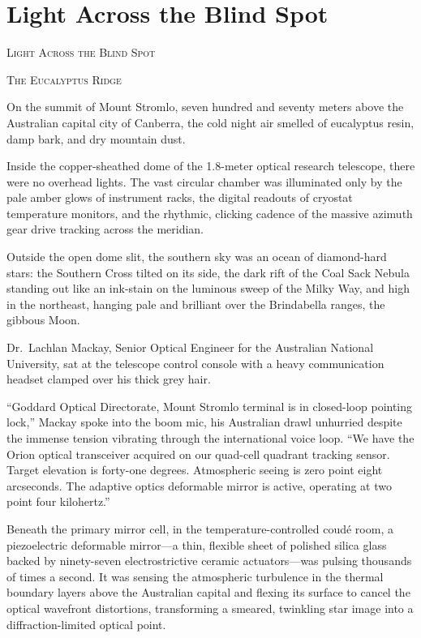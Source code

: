 \documentclass[12pt,twoside,openright]{book}
\newcommand{\sceneheader}[1]{%
  \par\vspace{1.8em}%
  {\noindent\centering\scshape\large #1\par}%
  \vspace{1.0em}%
  \noindent%
}
\begin{document}
\chapter{Light Across the Blind Spot}
\sceneheader{Light Across the Blind
Spot}

\sceneheader{The Eucalyptus Ridge}

On the summit of Mount Stromlo, seven hundred and seventy meters above
the Australian capital city of Canberra, the cold night air smelled of
eucalyptus resin, damp bark, and dry mountain dust.

Inside the copper-sheathed dome of the 1.8-meter optical research
telescope, there were no overhead lights. The vast circular chamber was
illuminated only by the pale amber glows of instrument racks, the
digital readouts of cryostat temperature monitors, and the rhythmic,
clicking cadence of the massive azimuth gear drive tracking across the
meridian.

Outside the open dome slit, the southern sky was an ocean of
diamond-hard stars: the Southern Cross tilted on its side, the dark rift
of the Coal Sack Nebula standing out like an ink-stain on the luminous
sweep of the Milky Way, and high in the northeast, hanging pale and
brilliant over the Brindabella ranges, the gibbous Moon.

Dr.~Lachlan Mackay, Senior Optical Engineer for the Australian National
University, sat at the telescope control console with a heavy
communication headset clamped over his thick grey hair.

``Goddard Optical Directorate, Mount Stromlo terminal is in closed-loop
pointing lock,'' Mackay spoke into the boom mic, his Australian drawl
unhurried despite the immense tension vibrating through the
international voice loop. ``We have the Orion optical transceiver
acquired on our quad-cell quadrant tracking sensor. Target elevation is
forty-one degrees. Atmospheric seeing is zero point eight arcseconds.
The adaptive optics deformable mirror is active, operating at two point
four kilohertz.''

Beneath the primary mirror cell, in the temperature-controlled coudé
room, a piezoelectric deformable mirror---a thin, flexible sheet of
polished silica glass backed by ninety-seven electrostrictive ceramic
actuators---was pulsing thousands of times a second. It was sensing the
atmospheric turbulence in the thermal boundary layers above the
Australian capital and flexing its surface to cancel the optical
wavefront distortions, transforming a smeared, twinkling star image into
a diffraction-limited optical point.
\end{document}
